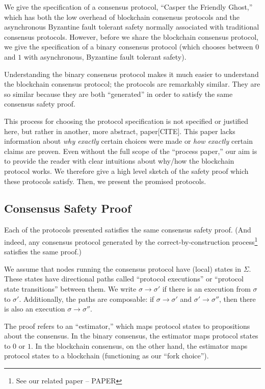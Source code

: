 \documentclass{article}
\theoremstyle{definition}
\begin{document}
We give the specification of a consensus protocol, ``Casper the Friendly Ghost,'' which has both the low overhead of blockchain consensus protocols and the asynchronous Byzantine fault tolerant safety normally associated with traditional consensus protocols. However, before we share the blockchain consensus protocol, we give the specification of a binary consensus protocol (which chooses between $0$ and $1$ with asynchronous, Byzantine fault tolerant safety).

Understanding the binary consensus protocol makes it much easier to understand the blockchain consensus protocol; the protocols are remarkably similar. They are so similar because they are both ``generated'' in order to satisfy the same consensus safety proof.

This process for choosing the protocol specification is not specified or justified here, but rather in another, more abstract, paper[CITE]. This paper lacks information about \emph{why exactly} certain choices were made or \emph{how exactly} certain claims are proven. Even without the full scope of the ``process paper,'' our aim is to provide the reader with clear intuitions about why/how the blockchain protocol works. We therefore give a high level sketch of the safety proof which these protocols satisfy. Then, we present the promised protocols.

\subsection{Consensus Safety Proof}

Each of the protocols presented satisfies the same consensus safety proof. (And indeed, any consensus protocol generated by the correct-by-construction process\footnote{See our related paper -- PAPER} satisfies the same proof.)

We assume that nodes running the consensus protocol have (local) states in $\Sigma$. These states have directional paths called ``protocol executions'' or ``protocol state transitions'' between them. We write $\sigma \to \sigma'$ if there is an execution from $\sigma$ to $\sigma'$. Additionally, the paths are composable: if $\sigma \to \sigma'$ and $\sigma' \to \sigma''$, then there is also an execution $\sigma \to \sigma''$.

The proof refers to an ``estimator,'' which maps protocol states to propositions about the consensus. In the binary consensus, the estimator maps protocol states to $0$ or $1$. In the blockchain consensus, on the other hand, the estimator maps protocol states to a blockchain (functioning as our ``fork choice'').
\end{document}
